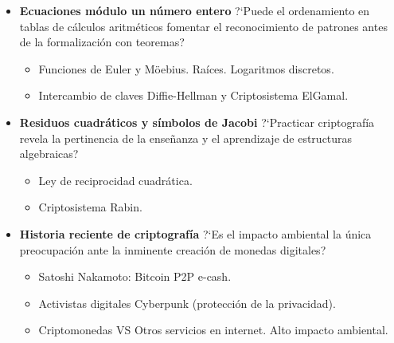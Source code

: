 \documentclass[aspectratio=169]{beamer}
\begin{document}
\begin{frame}
    \begin{itemize}

    \item \textbf{{\green Ecuaciones m\'odulo un n\'umero entero}} ?`Puede el ordenamiento en tablas de c\'alculos aritm\'eticos fomentar el
    reconocimiento de patrones antes de la formalizaci\'on con teoremas? \pause
        \begin{itemize}
            \item Funciones de Euler y M\"oebius. Ra\'ices. Logaritmos discretos.
            \item Intercambio de claves Diffie-Hellman y Criptosistema ElGamal. \pause
        \end{itemize}

    \item \textbf{{\green Residuos cuadr\'aticos y s\'imbolos de Jacobi}} ?`Practicar criptograf\'ia revela la pertinencia
     de la enseñanza y el aprendizaje de estructuras algebraicas? \pause
        \begin{itemize}
            \item Ley de reciprocidad cuadr\'atica. 
            \item Criptosistema Rabin. \pause
        \end{itemize}

    \item \textbf{{\green Historia reciente de criptograf\'ia}} ?`Es el impacto ambiental la \'unica preocupaci\'on ante la inminente
     creaci\'on de monedas digitales? \pause
        \begin{itemize}
            \item Satoshi Nakamoto: Bitcoin P2P e-cash. 
            \item Activistas digitales Cyberpunk (protección de la privacidad).
            \item Criptomonedas VS Otros servicios en internet. Alto impacto ambiental.\pause
        \end{itemize}

    \end{itemize}

\end{frame}
\end{document}
